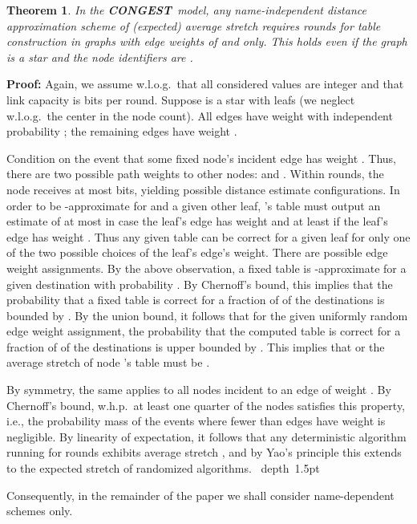 \documentclass[letterpaper,11pt]{article}
\newtheorem{theorem}{Theorem}[section]
\newcommand{\blackslug}{\hbox{\hskip 1pt \vrule width 4pt height 8pt
depth 1.5pt \hskip 1pt}}
\newcommand{\QED}{\quad\blackslug\lower 8.5pt\null\par}
\newenvironment{proof}[1][Proof:]{\noindent \textbf{#1}\xspace}{\QED}
\newcommand{\CONGEST}{\textbf{CONGEST}}
\begin{document}
\begin{theorem}\label{thm:lower_dist_independent}
In the \CONGEST\ model, any name-independent distance approximation scheme of
(expected) average stretch  requires  rounds for table
construction in graphs with edge weights of  and 
only. This holds even if the graph is a star and the node identifiers are
.
\end{theorem}
\begin{proof}
Again, we assume w.l.o.g.\ that all considered values are integer and that link
capacity is  bits per round. Suppose  is a star with  leafs (we
neglect w.l.o.g.\ the center in the node count). All edges have weight
 with independent probability ; the remaining edges have
weight .

Condition on the event that some fixed node's  incident edge has weight .
Thus, there are two possible path weights to other nodes:  and
. Within  rounds, the node receives at most  bits, yielding
 possible distance estimate configurations. In order to be
-approximate for  and a given other leaf, 's
table must output an estimate of at most  in case the
leaf's edge has weight  and at least  if the leaf's edge has
weight . Thus any given table can be correct for a given leaf for
only one of the two possible choices of the leaf's edge's weight. There are
 possible edge weight assignments. By the above
observation, a fixed table is -approximate for a given destination with
probability . By Chernoff's bound, this implies that the probability that a
fixed table is correct for a fraction of  of the destinations is bounded by
. By the union bound, it follows that for the given uniformly
random edge weight assignment, the probability that the computed table is
correct for a fraction of  of the destinations is upper bounded by
. This implies that  or the
average stretch of node 's table must be .

By symmetry, the same applies to all nodes incident to an edge of weight . By
Chernoff's bound, w.h.p.\ at least one quarter of the nodes satisfies this
property, i.e., the probability mass of the events where fewer than  edges
have weight  is negligible. By linearity of expectation, it follows that any
deterministic algorithm running for  rounds exhibits average
stretch , and by Yao's principle this extends to the
expected stretch of randomized algorithms.
\end{proof}

Consequently, in the remainder of the paper we shall consider
name-dependent schemes only.
\end{document}
